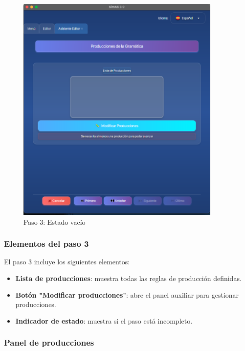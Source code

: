 \needspace{8cm}
\begin{figure}[H]
    \centering
    \includegraphics[width=0.9\textwidth]{figuras/editor/paso3_producciones_vacio.png}
    \caption{Paso 3: Estado vacío}
    \label{fig:paso3_vacio}
\end{figure}

\subsubsection{Elementos del paso 3}

El paso 3 incluye los siguientes elementos:

\begin{itemize}
    \item \textbf{Lista de producciones}: muestra todas las reglas de producción definidas.
    \item \textbf{Botón \string"Modificar producciones\string"}: abre el panel auxiliar para gestionar producciones.
    \item \textbf{Indicador de estado}: muestra si el paso está incompleto.
\end{itemize}

\subsubsection{Panel de producciones}

